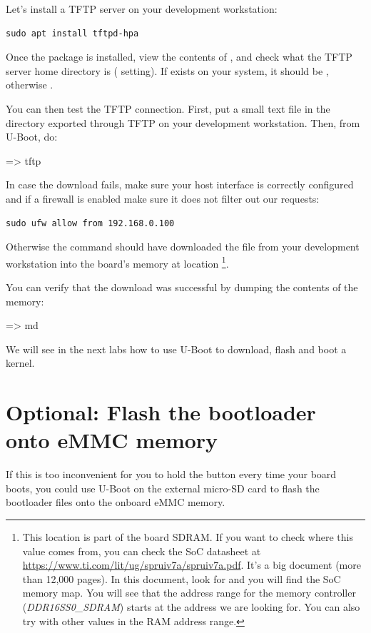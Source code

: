 Let's install a TFTP server on your development workstation:

\begin{verbatim}
sudo apt install tftpd-hpa
\end{verbatim}

Once the package is installed, view the contents of
, and check what the TFTP server home directory is
( setting). If  exists on your system,
it should be , otherwise .

You can then test the TFTP connection. First, put a small text file in
the directory exported through TFTP on your development
workstation. Then, from U-Boot, do:

\begin{ubootinput}
=> tftp %
\end{ubootinput}

In case the download fails, make sure your host interface is correctly
configured and if a firewall is enabled make sure it does not filter out our
requests:
\begin{verbatim}
sudo ufw allow from 192.168.0.100
\end{verbatim}

Otherwise the  command should have downloaded the
 file from your development workstation into
the board's memory at location {\tt \zimageboardaddr}\footnote{
This location is part of the board SDRAM. If you want
to check where this value comes from, you can check the SoC
datasheet at
\url{https://www.ti.com/lit/ug/spruiv7a/spruiv7a.pdf}.
It's a big document (more than 12,000 pages). In this document, look
for  and you will find the SoC memory map.
You will see that the address range for the memory controller
({\em DDR16SS0\_SDRAM})
starts at the address we are looking for.
You can also try with other values in the RAM address range.}.

You can verify that the download was successful by dumping the
contents of the memory:

\begin{ubootinput}
=> md %
\end{ubootinput}

We will see in the next labs how to use U-Boot to download, flash and
boot a kernel.

\section{Optional: Flash the bootloader onto eMMC memory}
If this is too inconvenient for you to hold the 
button every time your board boots, you could use U-Boot on the external
micro-SD card to flash the bootloader files onto the onboard eMMC memory.

